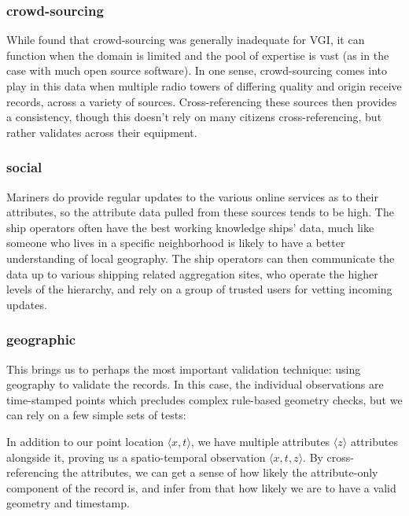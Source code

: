 \subsubsection{crowd-sourcing}
While \citep{goodchildli2012} found that crowd-sourcing was generally inadequate for VGI, it can function when the domain is limited and the pool of expertise is vast (as in the case with much open source software). In one sense, crowd-sourcing comes into play in this data when multiple radio towers of differing quality and origin receive records, across a variety of sources. Cross-referencing these sources then provides a consistency, though this doesn't rely on many citizens cross-referencing, but rather validates across their equipment.

\subsubsection{social}
Mariners do provide regular updates to the various online services as to their attributes, so the attribute data pulled from these sources tends to be high. The ship operators often have the best working knowledge ships' data, much like someone who lives in a specific neighborhood is likely to have a better understanding of local geography. The ship operators can then communicate the data up to various shipping related aggregation sites, who operate the higher levels of the hierarchy, and rely on a group of trusted users for vetting incoming updates.

\subsubsection{geographic}
This brings us to perhaps the most important validation technique: using geography to validate the records. In this case, the individual observations are time-stamped points which precludes complex rule-based geometry checks, but we can rely on a few simple sets of tests:

In addition to our point location $\langle x,t \rangle$, we have multiple attributes $\langle z \rangle$ attributes alongside it, proving us a spatio-temporal observation $\langle x,t,z \rangle$. By cross-referencing the attributes, we can get a sense of how likely the attribute-only component of the record is, and infer from that how likely we are to have a valid geometry and timestamp.

